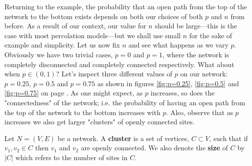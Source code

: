 Returning to the example, the probability that an open path from the top of the network to the bottom exists depends on both our choices of both $p$ and $n$ from before. As a result of our context, our value for $n$ should be
large---this is the case with most percolation models---but we shall use small $n$ for the sake of example and simplicity. Let us now fix $n$ and see what happens as we vary $p$. Obviously we have two trivial cases, $p=0$ and $p=1$,
where the network is completely disconnected and completely connected respectively.
What about when $p\in(0,1)$? Let's inspect three different values of $p$ on our network: $p=0.25$, $p=0.5$ and $p=0.75$ as shown in figures \ref{fig:p=0.25}, \ref{fig:p=0.5} and
\ref{fig:p=0.75} on page \pageref{fig:probabilities}.
As one might expect, as $p$ increases, so does the "connectedness" of the network; i.e. the probability of having an open path from the top of the network to the bottom increases
with $p$. Also, observe that as $p$ increases we also get larger "clusters" of openly connected sites.

\begin{definition}\label{def:cluster}
  Let $N=(V, E)$ be a network. A \textbf{cluster} is a set of vertices, $C \subset V$, such that if $v_1, v_2 \in C$ then $v_1$ and $v_2$ are openly connected. We also denote the
  \textbf{size} of $C$ by $|C|$ which refers to the number of sites in $C$.
\end{definition}


